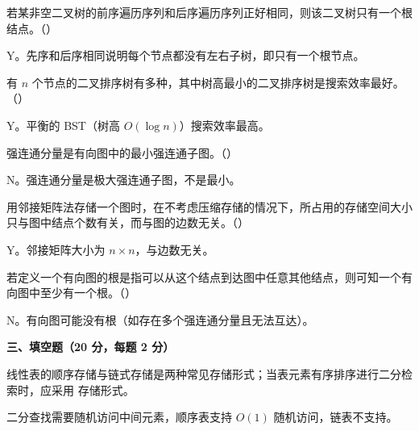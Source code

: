 \begin{question}
若某非空二叉树的前序遍历序列和后序遍历序列正好相同，则该二叉树只有一个根结点。（\quad）
\begin{solution}
Y。先序和后序相同说明每个节点都没有左右子树，即只有一个根节点。
\end{solution}
\end{question}

\begin{question}
有 $n$ 个节点的二叉排序树有多种，其中树高最小的二叉排序树是搜索效率最好。（\quad）
\begin{solution}
Y。平衡的 BST（树高 $O(\log n)$）搜索效率最高。
\end{solution}
\end{question}

\begin{question}
强连通分量是有向图中的最小强连通子图。（\quad）
\begin{solution}
N。强连通分量是极大强连通子图，不是最小。
\end{solution}
\end{question}

\begin{question}
用邻接矩阵法存储一个图时，在不考虑压缩存储的情况下，所占用的存储空间大小只与图中结点个数有关，而与图的边数无关。（\quad）
\begin{solution}
Y。邻接矩阵大小为 $n\times n$，与边数无关。
\end{solution}
\end{question}

\begin{question}
若定义一个有向图的根是指可以从这个结点到达图中任意其他结点，则可知一个有向图中至少有一个根。（\quad）
\begin{solution}
N。有向图可能没有根（如存在多个强连通分量且无法互达）。
\end{solution}
\end{question}

\clearpage

\textbf{三、填空题（20 分，每题 2 分）}

\begin{question}
线性表的顺序存储与链式存储是两种常见存储形式；当表元素有序排序进行二分检索时，应采用 \underline{\hspace{4em}} 存储形式。
\begin{solution}
二分查找需要随机访问中间元素，顺序表支持 $O(1)$ 随机访问，链表不支持。
\end{solution}
\end{question}

